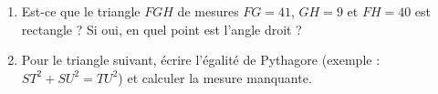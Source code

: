 
\begin{exercice}\label{exosmath-0963}

    \begin{enumerate}
        \item
            Est-ce que le triangle \( FGH\) de mesures \( FG=41\), \( GH=9\) et \( FH=40\) est rectangle ? Si oui, en quel point est l'angle droit ?
        \item
            Pour le triangle suivant, écrire l'égalité de Pythagore (exemple : \( ST^2+SU^2=TU^2\)) et calculer la mesure manquante.
            \begin{center}
   
            \end{center}
    \end{enumerate}

\end{exercice}
